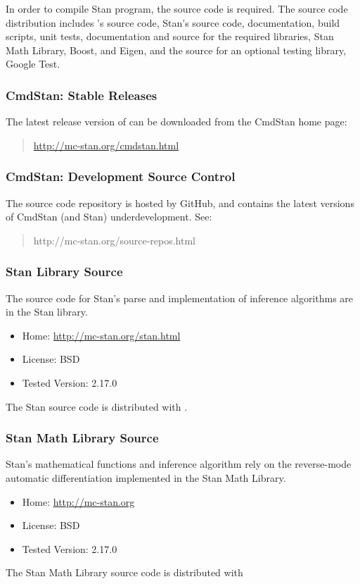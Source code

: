 In order to compile Stan program, the \CmdStan source code is
required.  The \CmdStan source code distribution includes \CmdStan's
source code, Stan's source code, documentation, build scripts, unit
tests, documentation and source for the required libraries, Stan Math
Library, Boost, and Eigen, and the source for an optional testing
library, Google Test.

\subsubsection{CmdStan: Stable Releases}

The latest release version of \CmdStan can be downloaded
from the CmdStan home page:
%
\begin{quote}
\url{http://mc-stan.org/cmdstan.html}
\end{quote}
%

\subsubsection{CmdStan: Development Source Control}

The source code repository is hosted by GitHub, and contains the
latest versions of CmdStan (and Stan) underdevelopment.  See:
%
\begin{quote}
http://mc-stan.org/source-repos.html
\end{quote}

\subsubsection{Stan Library Source}

The source code for Stan's parse and implementation of inference
algorithms are in the Stan library.
%
\begin{itemize}
\item Home: \url{http://mc-stan.org/stan.html}
\item License: BSD
\item Tested Version: 2.17.0
\end{itemize}
%
The Stan source code is distributed with \CmdStan.

\subsubsection{Stan Math Library Source}

Stan's mathematical functions and inference algorithm rely on the
reverse-mode automatic differentiation implemented in the Stan Math
Library.
%
\begin{itemize}
\item Home: \url{http://mc-stan.org}
\item License: BSD
\item Tested Version: 2.17.0
\end{itemize}
%
The Stan Math Library source code is distributed with \CmdStan

